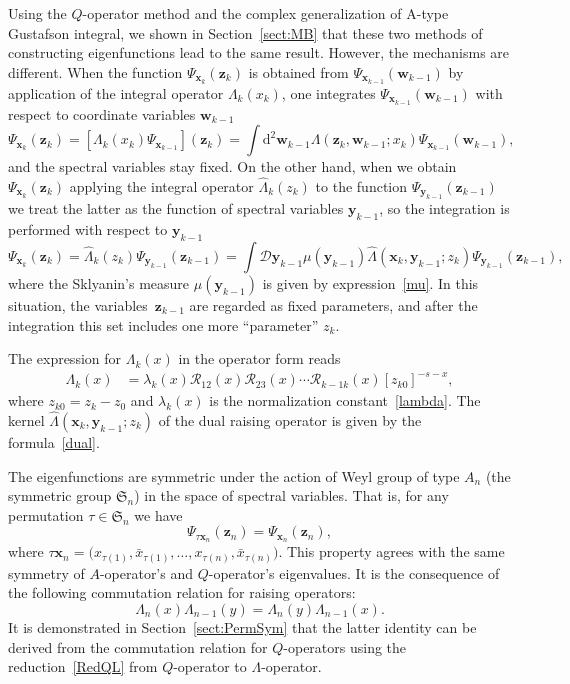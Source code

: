 \documentclass[pdftex]{sigma}
\numberwithin{equation}{section}
\begin{document}
Using the $Q$-operator method and the complex generalization of A-type Gustafson integral, we shown in Section~\ref{sect:MB} that these two methods of constructing eigenfunctions lead to the same result. However, the mechanisms are different. When the function $\Psi_{\bm{x}_{k}}(\bm{z}_k)$ is obtained from $\Psi_{\bm{x}_{k-1}}(\bm{w}_{k-1})$ by application of the integral operator $\Lambda_k(x_k)$, one integrates $\Psi_{\bm{x}_{k-1}}(\bm{w}_{k-1})$ with respect to coordinate variables $\bm{w}_{k-1}$
\begin{equation*}
	\Psi_{\bm{x}_{k}}(\bm{z}_k)=[\Lambda_k(x_k) \Psi_{\bm{x}_{k-1}}](\bm z_k) = \int \mathrm{d}^{2} \bm w_{k-1}
	\Lambda(\bm z_k,\bm w_{k-1};x_k) \Psi_{\bm{x}_{k-1}}(\bm w_{k-1}) ,
\end{equation*}
and the spectral variables stay fixed.
On the other hand, when we obtain $\Psi_{\bm{x}_{k}}(\bm{z}_k)$ applying the integral operator $\hat{\Lambda}_k(z_k)$ to the function $\Psi_{\bm{y}_{k-1}}(\bm{z}_{k-1})$ we treat the latter as the function of spectral variables $\bm{y}_{k-1}$, so the integration is performed with respect to $\bm{y}_{k-1}$
\begin{equation*}
	\Psi_{\bm{x}_{k}}(\bm{z}_{k}) = \hat{\Lambda}_k(z_k) \Psi_{\bm{y}_{k-1}}(\bm{z}_{k-1}) = \int \mathcal{D}\bm{y}_{k-1} \mu(\bm{y}_{k-1}) \hat{\Lambda}(\bm{x}_k,\bm{y}_{k-1};z_k) \Psi_{\bm{y}_{k-1}}(\bm{z}_{k-1}) ,
\end{equation*}
where the Sklyanin's measure $\mu(\bm{y}_{k-1})$ is given by expression~\eqref{mu}.
In this situation, the variables~$\bm{z}_{k-1}$ are regarded as fixed parameters, and after the integration this set includes one more ``parameter'' $z_k$.

The expression for $\Lambda_k(x)$ in the operator form reads
\begin{align*}
	\Lambda_k(x) & = \lambda_k(x) \mathcal{R}_{12}(x)\mathcal{R}_{23}(x)\cdots
	\mathcal{R}_{k-1 k}(x) [z_{k0}]^{-s-x} ,
\end{align*}
where $z_{k0}=z_k-z_0$ and $\lambda_k(x)$ is the normalization constant~\eqref{lambda}. The kernel $\hat{\Lambda}(\bm{x}_k,\bm{y}_{k-1};z_k)$ of the dual raising operator is given by the formula~\eqref{dual}.

The eigenfunctions are symmetric under the action of Weyl group of type $A_n$ (the symmetric group $\mathfrak{S}_n$) in the space of spectral variables. That is, for any permutation $\tau\in\mathfrak{S}_n$ we have
\begin{equation*}
	\Psi_{\tau \bm x_n}(\bm z_n) = \Psi_{\bm x_n}(\bm z_n) ,
\end{equation*}
where $\tau \bm x_n = \bigl(x_{\tau(1)},\bar{x}_{\tau(1)}, \dots , x_{\tau(n)},\bar{x}_{\tau(n)}\bigr)$. This property agrees with the same symmetry of $A$-operator's and $Q$-operator's eigenvalues. It is the consequence of the following commutation relation for raising operators:
\begin{equation*}
	\Lambda_n(x) \Lambda_{n-1}(y) =
	\Lambda_n(y) \Lambda_{n-1}(x) .
\end{equation*}
It is demonstrated in Section~\ref{sect:PermSym} that the latter identity can be derived from the commutation relation for $Q$-operators using the reduction~\eqref{RedQL} from $Q$-operator to $\Lambda$-operator.
\end{document}
